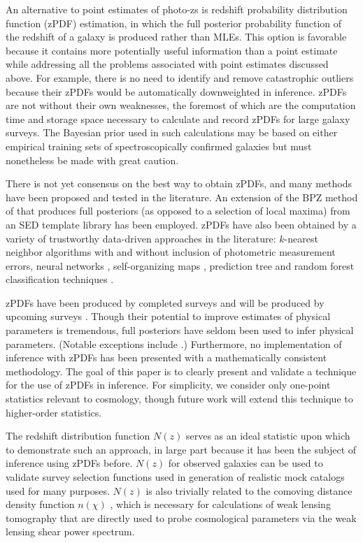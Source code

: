 \documentclass[preprint]{aastex}
\begin{document}
An alternative to point estimates of photo-zs is redshift probability 
distribution function (zPDF) estimation, in which the full posterior 
probability function of the redshift of a galaxy is produced rather than MLEs.  
\citep{bud08}  This option is favorable because it contains more potentially 
useful information than a point estimate while addressing all the problems 
associated with point estimates discussed above.  For example, there is no need 
to identify and remove catastrophic outliers because their zPDFs would be 
automatically downweighted in inference.  zPDFs are not without their own 
weaknesses, the foremost of which are the computation time and storage space 
necessary to calculate and record zPDFs for large galaxy surveys.  
\citep{car14b}  The Bayesian prior used in such calculations may be based on 
either empirical training sets of spectroscopically confirmed galaxies but must 
nonetheless be made with great caution.

There is not yet consensus on the best way to obtain zPDFs, and many methods 
have been proposed and tested in the literature.  An extension of the BPZ 
method of \citet{ben98} that produces full posteriors (as opposed to a 
selection of local maxima) from an SED template library has been employed.  
\citep{hil11, kel12, lop14}  zPDFs have also been obtained by a variety of 
trustworthy data-driven approaches in the literature: $k$-nearest neighbor 
algorithms with \citep{bal08} and without \citep{she11} inclusion of 
photometric measurement errors, neural networks \citep{bon13}, self-organizing 
maps \citep{car14a}, prediction tree and random forest classification 
techniques \citep{car10, car13}.  

zPDFs have been produced by completed surveys \citep{hil11, she11} and will be 
produced by upcoming surveys \citep{abe09, car14a}.  Though their potential to 
improve estimates of physical parameters is tremendous, full posteriors have 
seldom been used to infer physical parameters.  (Notable exceptions include 
\citet{app12}.)  Furthermore, no implementation of inference with zPDFs has 
been presented with a mathematically consistent methodology.  The goal of this 
paper is to clearly present and validate a technique for the use of zPDFs in 
inference.  For simplicity, we consider only one-point statistics relevant to 
cosmology, though future work will extend this technique to higher-order 
statistics.

The redshift distribution function $N(z)$ serves as an ideal statistic upon 
which to demonstrate such an approach, in large part because it has been the 
subject of inference using zPDFs before.  \citep{she11, kel12, ben12, bon13, 
vii15}  $N(z)$ for observed galaxies can be used to validate survey selection 
functions used in generation of realistic mock catalogs used for many purposes. 
 \citep{nor01}  $N(z)$ is also trivially related to the comoving distance 
density function $n(\chi)$ \citep{hog99}, which is necessary for calculations 
of weak lensing tomography that are directly used to probe cosmological 
parameters via the weak lensing shear power spectrum.  \citep{mas15}
\end{document}

